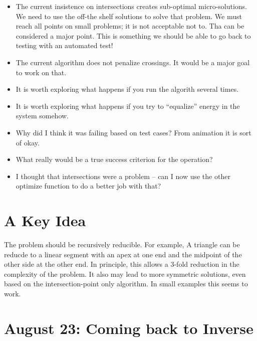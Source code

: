 \documentclass[11pt]{article}
\begin{document}
\begin{itemize}
\item The current insistence on intersections creates sub-optimal micro-solutions. We need to use the off-the shelf solutions to solve that problem. We must reach all points on small problems; it is not acceptable not to. Tha
  can be considered a major point. This is something we should be able to go back to testing with an automated test!
  
\item The current algorithm does not penalize crossings. It would be a major goal to work on that.
\item It is worth exploring what happens if you run the algorith several times.
 \item It is worth exploring what happens if you try to ``equalize'' energy in the system somehow.
 \item Why did I think it was failing based on test cases?  From animation it is sort of okay.
 \item What really would be a true success criterion for the operation?
 \item I thought that intersections were a problem -- can I now use the other optimize function
   to do a better job with that?
\end{itemize}



\section{A Key Idea}

The problem should be recursively reducible. For example, A triangle can
be reducde to a linear segment with an apex at one end and the midpoint of the
other side at the other end.  In principle, this allows a 3-fold reduction
in the complexity of the problem.  It also may lead to more symmetric solutions,
even based on the intersection-point only algorithm.  In small examples this seems
to work.

\section{August 23: Coming back to Inverse}
\end{document}
